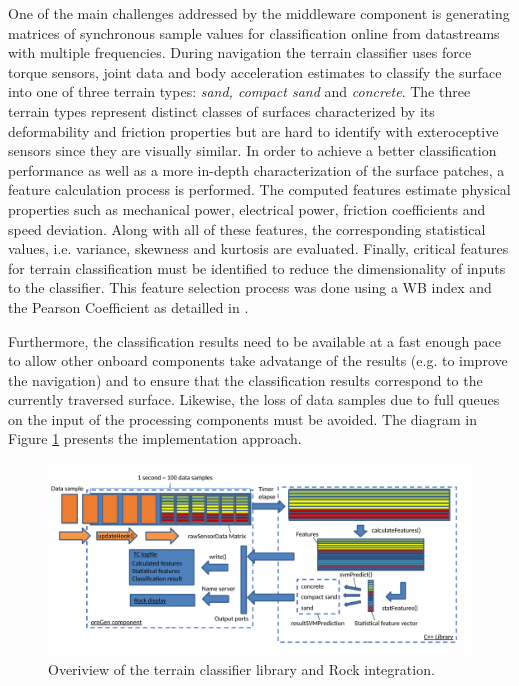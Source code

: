 \documentclass{article}
\begin{document}
One of the main challenges addressed by the middleware component is generating matrices of synchronous sample values for classification online from datastreams with multiple frequencies.
During navigation the terrain classifier uses force torque sensors, joint data and body acceleration estimates to classify the surface into one of three terrain types: \emph{sand, compact sand} and \emph{concrete}.
The three terrain types represent distinct classes of surfaces characterized by its deformability and friction properties but are hard to identify with exteroceptive sensors since they are visually similar.
In order to achieve a better classification performance as well as a more in-depth characterization of the surface patches, a feature calculation process is performed. 
The computed features estimate physical properties such as mechanical power, electrical power, friction coefficients and speed deviation. Along with all of these features, the corresponding statistical values, i.e. variance, skewness and kurtosis are evaluated. 
Finally, critical features for terrain classification must be identified to reduce the dimensionality of inputs to the classifier.
This feature selection process was done using a WB index and the Pearson Coefficient as detailled in \cite{Dimastrogiovanni2020}. 

Furthermore, the classification results need to be available at a fast enough pace to allow other onboard components take advatange of the results (e.g. to improve the navigation) and to ensure that the classification results correspond to the currently traversed surface. 
Likewise, the loss of data samples due to full queues on the input of the processing components must be avoided. 
The diagram in Figure \ref{fig:overview} presents the implementation approach.

\begin{figure}
\centering
\includegraphics[width=\textwidth]{../figures/OverviewTC2.pdf}
\caption{\label{fig:overview}Overiview of the terrain classifier library and Rock integration.}
\end{figure}
\end{document}
